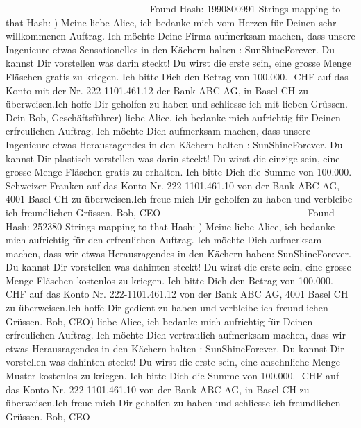 \documentclass[10pt]{scrartcl}
\begin{document}
--------------------------------------------\newline
Found Hash: 1990800991\newline
Strings mapping to that Hash: ) Meine liebe Alice, ich bedanke mich vom Herzen für Deinen sehr willkommenen Auftrag. Ich möchte Deine Firma aufmerksam machen, dass unsere Ingenieure etwas Sensationelles in den Kächern  halten : SunShineForever. Du kannst Dir  vorstellen was darin steckt! Du wirst die erste  sein, eine grosse Menge Fläschen gratis zu kriegen. Ich bitte Dich den Betrag von 100.000.- CHF auf das Konto mit der Nr. 222-1101.461.12 der  Bank ABC AG, in Basel CH zu überweisen.Ich hoffe Dir geholfen zu haben und schliesse ich mit lieben Grüssen. Dein Bob, Geschäftsführer) liebe Alice, ich bedanke mich aufrichtig für Deinen erfreulichen Auftrag. Ich möchte Dich aufmerksam machen, dass unsere Ingenieure etwas Herausragendes in den Kächern  halten : SunShineForever. Du kannst Dir plastisch vorstellen was darin steckt! Du wirst die einzige sein, eine grosse Menge Fläschen gratis zu erhalten. Ich bitte Dich die Summe von 100.000.- Schweizer Franken auf das Konto Nr. 222-1101.461.10 von der Bank ABC AG, 4001 Basel CH zu überweisen.Ich freue mich Dir geholfen zu haben und verbleibe ich freundlichen Grüssen. Bob, CEO\newline
--------------------------------------------\newline
Found Hash: 252380\newline
Strings mapping to that Hash: ) Meine liebe Alice, ich bedanke mich aufrichtig für den erfreulichen Auftrag. Ich möchte Dich aufmerksam machen, dass wir etwas Herausragendes in den Kächern haben: SunShineForever. Du kannst Dir  vorstellen was dahinten steckt! Du wirst die erste  sein, eine grosse Menge Fläschen kostenlos zu kriegen. Ich bitte Dich den Betrag von 100.000.- CHF auf das Konto Nr. 222-1101.461.12 von der Bank ABC AG, 4001 Basel CH zu überweisen.Ich hoffe Dir gedient zu haben und verbleibe ich freundlichen Grüssen. Bob, CEO) liebe Alice, ich bedanke mich aufrichtig für Deinen erfreulichen Auftrag. Ich möchte Dich vertraulich aufmerksam machen, dass wir etwas Herausragendes in den Kächern  halten : SunShineForever. Du kannst Dir  vorstellen was dahinten steckt! Du wirst die erste  sein, eine ansehnliche Menge Muster kostenlos zu kriegen. Ich bitte Dich die Summe von 100.000.- CHF auf das Konto Nr. 222-1101.461.10 von der Bank ABC AG, in Basel CH zu überweisen.Ich freue mich Dir geholfen zu haben und schliesse ich freundlichen Grüssen. Bob, CEO\newline
\end{document}
